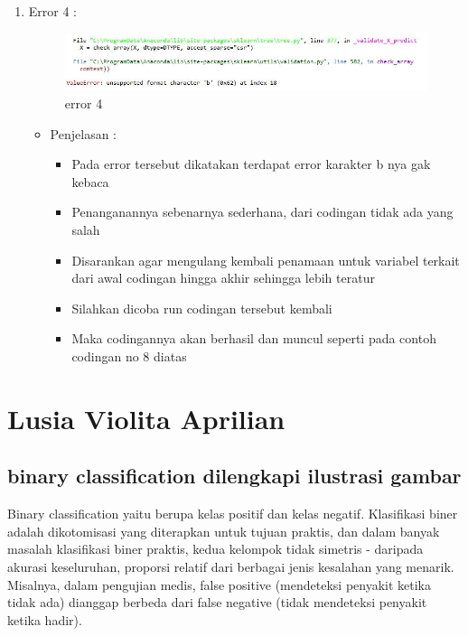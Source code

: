 \begin{enumerate}
\begin{enumerate}
\par
\item Error 4	:
\par

\begin{figure}[ht]
\centering
\includegraphics[scale=0.4]{figures/error8.jpg}
\caption{error 4}
\label{contoh}
\end{figure}

\par

\par
\begin{itemize}
\item Penjelasan	: 
\begin{itemize}
\item Pada error tersebut dikatakan terdapat error karakter b nya gak kebaca
\item Penanganannya sebenarnya sederhana, dari codingan tidak ada yang salah
\item Disarankan agar mengulang kembali penamaan untuk variabel terkait dari awal codingan hingga akhir sehingga lebih teratur
\item Silahkan dicoba run codingan tersebut kembali
\item Maka codingannya akan berhasil dan muncul seperti pada contoh codingan no 8 diatas
\end{itemize}
\end{itemize}

\end{enumerate}
\end{enumerate}

\section{Lusia Violita Aprilian}
\subsection{binary classification dilengkapi ilustrasi gambar}

\par Binary classification yaitu berupa kelas positif dan kelas negatif. Klasifikasi biner adalah dikotomisasi yang diterapkan untuk tujuan praktis, dan dalam banyak masalah klasifikasi biner praktis, kedua kelompok tidak simetris - daripada akurasi keseluruhan, proporsi relatif dari berbagai jenis kesalahan yang menarik. Misalnya, dalam pengujian medis, false positive (mendeteksi penyakit ketika tidak ada) dianggap berbeda dari false negative (tidak mendeteksi penyakit ketika hadir).

